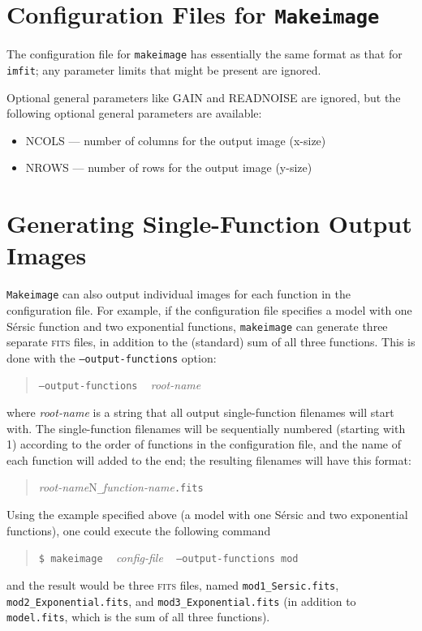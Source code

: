 \documentclass[10pt,a4paper,article]{memoir}
\newcommand{\imfit}{\texttt{imfit}}
\newcommand{\makeimage}{\texttt{makeimage}}
\newcommand{\Makeimage}{\texttt{Makeimage}}
\begin{document}
\section{Configuration Files for \Makeimage{}}

The configuration file for \makeimage{} has essentially the same format as
that for \imfit; any parameter limits that might be present are ignored.

Optional general parameters like GAIN and READNOISE are ignored, but the
following optional general parameters are available:

\begin{itemize}
\item NCOLS --- number of columns for the output image (x-size)

\item NROWS --- number of rows for the output image (y-size)

\end{itemize}




\section{Generating Single-Function Output Images}

\Makeimage{} can also output individual images for each function
in the configuration file. For example, if the configuration file specifies
a model with one S\'ersic function and two exponential functions, \makeimage{}
can generate three separate \textsc{fits} files, in addition to the (standard) sum of
all three functions.  This is done with the \texttt{--output-functions} option:
\begin{quote}
  \texttt{--output-functions} ~ \textit{root-name}
\end{quote}
where \textit{root-name} is a string that all output single-function filenames will
start with. The single-function filenames will be sequentially numbered (starting
with 1) according to the order of functions in the configuration file, and the
name of each function will added to the end; the resulting filenames will have
this format:
\begin{quote}
  \textit{root-name}{N}\texttt{\_}\textit{function-name}\texttt{.fits}
\end{quote}

Using the example specified above (a model with one S\'ersic and two exponential
functions), one could execute the following command
\begin{quote}
  \texttt{\$ \makeimage} ~ \textit{config-file} ~ \texttt{--output-functions mod}
\end{quote}
and the result would be three \textsc{fits} files, named \texttt{mod1\_Sersic.fits},
\texttt{mod2\_Exponential.fits}, and \texttt{mod3\_Exponential.fits} (in addition
to \texttt{model.fits}, which is the sum of all three functions).
\end{document}
